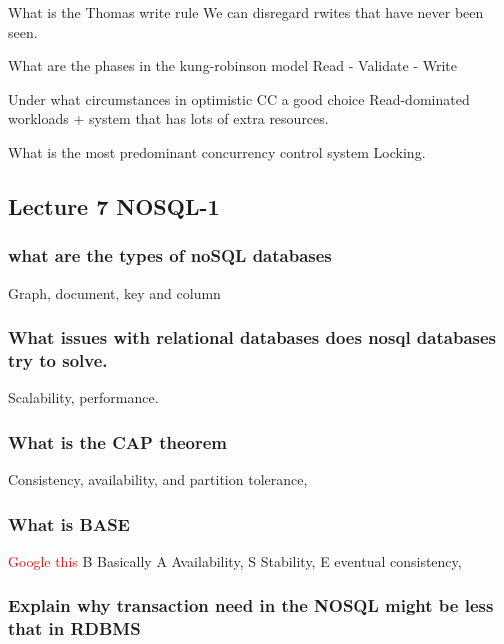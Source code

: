 \documentclass[a4paper,10pt,titlepage]{report}
\begin{document}
What is the Thomas write rule
We can disregard rwites that have never been seen.


What are the phases in the kung-robinson model
Read - Validate - Write

Under what circumstances in optimistic CC a good choice
Read-dominated workloads + system that has lots of extra resources.

What is the most predominant concurrency control system
Locking.


\subsection{Lecture 7 NOSQL-1}

\subsubsection{what are the types of noSQL databases }
Graph, document, key and column


\subsubsection{What issues with relational databases does nosql databases try to solve.}
Scalability, performance.

\subsubsection{What is the CAP theorem}
Consistency, availability, and partition tolerance, 

\subsubsection{What is BASE}
\textcolor{red}{Google this}
B Basically
A Availability,
S Stability, 
E eventual consistency,
\subsubsection{Explain why transaction need in the NOSQL might be less that in RDBMS}
\end{document}
